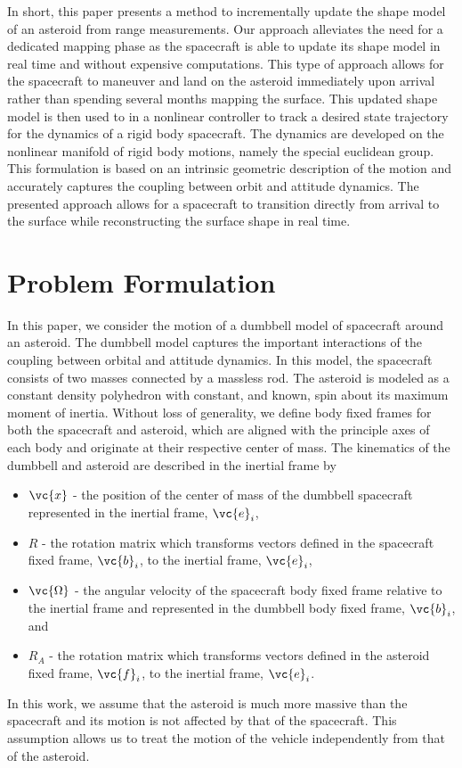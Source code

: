 \documentclass[journal]{new-aiaa}
\begin{document}
In short, this paper presents a method to incrementally update the shape  model of an asteroid from range measurements. 
Our approach alleviates the need for a dedicated mapping phase as the spacecraft is able to update its shape model in real time and without expensive computations.
This type of approach allows for the spacecraft to maneuver and land on the asteroid immediately upon arrival rather than spending several months mapping the surface.
This updated shape model is then used to in a nonlinear controller to track a desired state trajectory for the dynamics of a rigid body spacecraft.
The dynamics are developed on the nonlinear manifold of rigid body motions, namely the special euclidean group.
This formulation is based on an intrinsic geometric description of the motion and accurately captures the coupling between orbit and attitude dynamics. 
The presented approach allows for a spacecraft to transition directly from arrival to the surface while reconstructing the surface shape in real time.

\section{Problem Formulation}\label{sec:problem}

In this paper, we consider the motion of a dumbbell model of spacecraft around an asteroid.
The dumbbell model captures the important interactions of the coupling between orbital and attitude dynamics.
In this model, the spacecraft consists of two masses connected by a massless rod.
The asteroid is modeled as a constant density polyhedron with constant, and known, spin about its maximum moment of inertia. 
Without loss of generality, we define body fixed frames for both the spacecraft and asteroid, which are aligned with the principle axes of each body and originate at their respective center of mass. 
The kinematics of the dumbbell and asteroid are described in the inertial frame by
\begin{itemize}
    \item \( \vc{x} \) - the position of the center of mass of the dumbbell spacecraft represented in the inertial frame, \( \vc{e}_i\),
    \item \( R \) - the rotation matrix which transforms vectors defined in the spacecraft fixed frame, \( \vc{b}_i \), to the inertial frame, \( \vc{e}_i \),
    \item \( \vc{\Omega} \) - the angular velocity of the spacecraft body fixed frame relative to the inertial frame and represented in the dumbbell body fixed frame, \( \vc{b}_i \), and
    \item \( R_A \) - the rotation matrix which transforms vectors defined in the asteroid fixed frame, \( \vc{f}_i \), to the inertial frame, \( \vc{e}_i \).
\end{itemize}
In this work, we assume that the asteroid is much more massive than the spacecraft and its motion is not affected by that of the spacecraft.
This assumption allows us to treat the motion of the vehicle independently from that of the asteroid. 
\end{document}
